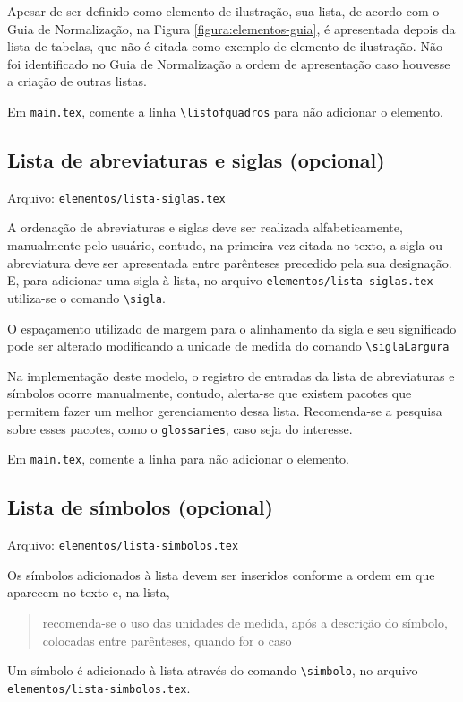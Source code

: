     Apesar de ser definido como elemento de ilustração, sua lista, de acordo com o Guia de Normalização, na Figura \ref{figura:elementos-guia}, é apresentada depois da lista de tabelas, que não é citada como exemplo de elemento de ilustração. Não foi identificado no Guia de Normalização a ordem de apresentação caso houvesse a criação de outras listas.

    Em \texttt{main.tex}, comente a linha \verb|\listofquadros| para não adicionar o elemento.

\subsection{Lista de abreviaturas e siglas (opcional)}
    Arquivo: \texttt{elementos/lista-siglas.tex}

    A ordenação de abreviaturas e siglas deve ser realizada alfabeticamente, manualmente pelo usuário, contudo, na primeira vez citada no texto, a sigla ou abreviatura deve ser apresentada entre parênteses precedido pela sua designação. E, para adicionar uma sigla à lista, no arquivo \texttt{elementos/lista-siglas.tex} utiliza-se o comando \verb|\sigla|.

    O espaçamento utilizado de margem para o alinhamento da sigla e seu significado pode ser alterado modificando a unidade de medida do comando \verb|\siglaLargura|

    Na implementação deste modelo, o registro de entradas da lista de abreviaturas e símbolos ocorre manualmente, contudo, alerta-se que existem pacotes que permitem fazer um melhor gerenciamento dessa lista. Recomenda-se a pesquisa sobre esses pacotes, como o \texttt{glossaries}, caso seja do interesse.

    Em \texttt{main.tex}, comente a linha \verb|| para não adicionar o elemento.

\subsection{Lista de símbolos (opcional)}
    Arquivo: \texttt{elementos/lista-simbolos.tex}

    Os símbolos adicionados à lista devem ser inseridos conforme a ordem em que aparecem no texto e, na lista, \blockcquote[p. 32]{livro:iffar-guia-normalizacao-2022}{recomenda-se o uso das unidades de medida, após a descrição do símbolo, colocadas entre parênteses, quando for o caso}. Um símbolo é adicionado à lista através do comando \verb|\simbolo|, no arquivo \texttt{elementos/lista-simbolos.tex}.

